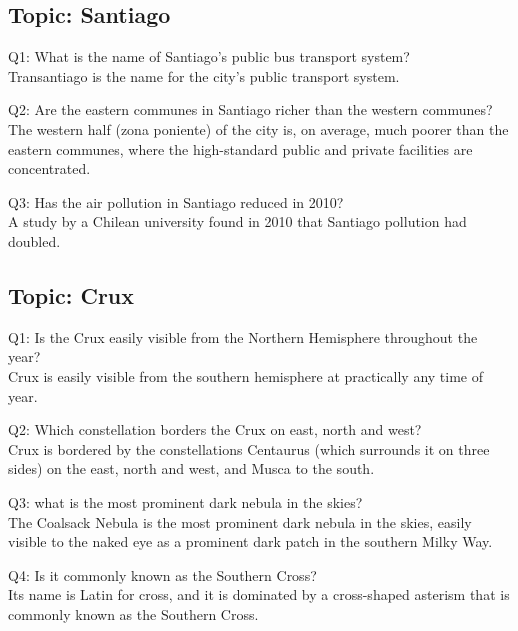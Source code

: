 \documentclass[12pt]{article}
\begin{document}
\subsection{Topic: Santiago}

Q1: What is the name of Santiago's public bus transport system? \\
Transantiago is the name for the city's public transport system.

Q2: Are the eastern communes in Santiago richer than the western communes? \\
The western half (zona poniente) of the city is, on average, much poorer than the eastern communes, where the high-standard public and private facilities are concentrated.

Q3: Has the air pollution in Santiago reduced in 2010? \\
A study by a Chilean university found in 2010 that Santiago pollution had doubled.

\subsection{Topic: Crux}

Q1: Is the Crux easily visible from the Northern Hemisphere throughout the year? \\
Crux is easily visible from the southern hemisphere at practically any time of year.

Q2: Which constellation borders the Crux on east, north and west? \\
Crux is bordered by the constellations Centaurus (which surrounds it on three sides) on the east, north and west, and Musca to the south.

Q3: what is the most prominent dark nebula in the skies? \\
The Coalsack Nebula is the most prominent dark nebula in the skies, easily visible to the naked eye as a prominent dark patch in the southern Milky Way.

Q4: Is it commonly known as the Southern Cross? \\
Its name is Latin for cross, and it is dominated by a cross-shaped asterism that is commonly known as the Southern Cross.
\end{document}
